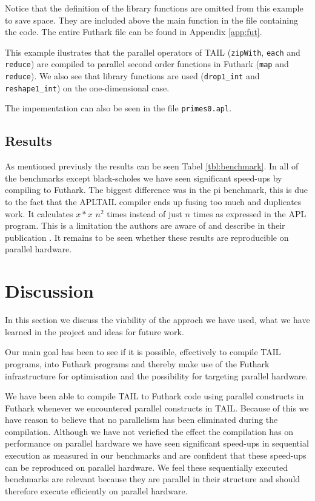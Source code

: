 \documentclass[11pt]{article}
\begin{document}
Notice that the definition of the library functions are omitted from this example to save space.
They are included above the main function in the file containing the code. The entire Futhark file can be found in Appendix \ref{app:fut}.

This example ilustrates that the parallel operators of TAIL ({\tt zipWith}, {\tt each} and {\tt reduce}) are compiled to parallel  second order functions in Futhark ({\tt map} and {\tt reduce}). 
We also see that library functions are used ({\tt drop1\_int} and {\tt reshape1\_int}) on the one-dimensional case.

The impementation can also be seen in the file {\tt primes0.apl}.

\subsection{Results}
As mentioned previusly the results can be seen Tabel \ref{tbl:benchmark}.
In all of the benchmarks except black-scholes we have seen significant speed-ups by compiling to Futhark.
The biggest difference was in the pi benchmark, this is due to the fact that the APLTAIL compiler ends up fusing too much and
duplicates work. It calculates $x * x$ $n^2$ times instead of just $n$ times as expressed in the APL program.
This is a limitation the authors are aware of and describe in their publication \cite{Array:2015}.
It remains to be seen whether these results are reproducible on parallel hardware.

\section{Discussion}
\label{sec:discussion}
In this section we discuss the viability of the approch we have used, what we have learned in the project and ideas for future work. 

Our main goal has been to see if it is possible, effectively to compile TAIL programs, into Futhark programs and thereby make use of the Futhark infrastructure for optimisation and the possibility for targeting parallel hardware.

We have been able to compile TAIL to Futhark code using parallel constructs in Futhark whenever we encountered parallel constructs in TAIL.
Because of this we have reason to believe that no parallelism has been eliminated during the compilation.
Although we have not veriefied the effect the compilation has on performance on parallel hardware we have seen significant speed-ups
in sequential execution as measured in our benchmarks and are confident that these speed-ups can be reproduced on parallel hardware.
We feel these sequentially executed benchmarks are relevant because they are parallel in their structure and should therefore execute efficiently on parallel
 hardware.
 
\end{document}
